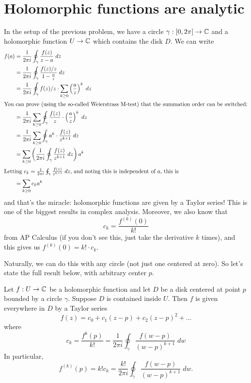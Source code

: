 \section{Holomorphic functions are analytic}
In the setup of the previous problem, we have a circle $\gamma : [0,2\pi] \to \mathbb C$
and a holomorphic function $U \to \mathbb C$ which contains the disk $D$.
We can write
\begin{align*}
	f(a) &= \frac{1}{2\pi i} \oint_\gamma \frac{f(z)}{z-a} \; dz \\
	&= \frac{1}{2\pi i} \oint_\gamma \frac{f(z)/z}{1 - \frac az} \; dz \\
	&= \frac{1}{2\pi i} \oint_\gamma f(z)/z \cdot \sum_{k \ge 0} \left( \frac az \right)^k \; dz \\
	\intertext{You can prove (using the so-called Weierstrass M-test) that the summation order can be switched:}
	&= \frac{1}{2\pi i} \sum_{k \ge 0} \oint_\gamma \frac{f(z)}{z} \cdot \left( \frac az \right)^k \; dz \\
	&= \frac{1}{2\pi i} \sum_{k \ge 0} \oint_\gamma a^k \cdot \frac{f(z)}{z^{k+1}} \; dz \\
	&=  \sum_{k \ge 0} \left( \frac{1}{2\pi i}\oint_\gamma \frac{f(z)}{z^{k+1}} \; dz \right) a^k \\
	\intertext{Letting $c_k =  \frac{1}{2\pi i}\oint_\gamma \frac{f(z)}{z^{k+1}} \; dz$, and noting
this is independent of $a$, this is}
	&=  \sum_{k \ge 0} c_k a^k
\end{align*}
and that's the miracle: holomorphic functions are given by a Taylor series!
This is one of the biggest results in complex analysis.
Moreover, we also know that \[ c_k = \frac{f^{(k)}(0)}{k!} \] from AP Calculus (if you don't see this,
just take the derivative $k$ times), and this gives us $f^{(k)}(0) = k! \cdot c_k$.

Naturally, we can do this with any circle (not just one centered at zero).
So let's state the full result below, with arbitrary center $p$.

\begin{theorem}
	Let $f : U \to \mathbb C$ be a holomorphic function and let $D$ be a disk centered at point $p$
	bounded by a circle $\gamma$.  Suppose $D$ is contained inside $U$.
	Then $f$ is given everywhere in $D$ by a Taylor series
	\[ 
		f(z) = c_0 + c_1(z-p) + c_2(z-p)^2 + \dots
	\]
	where
	\[
		c_k = \frac{f^{k}(p)}{k!} = \frac{1}{2\pi i} \oint_\gamma \frac{f(w-p)}{(w-p)^{k+1}} \; dw
	\]
	In particular, 
	\[ f^{(k)}(p) = k! c_k = \frac{k!}{2\pi i} \oint_\gamma \frac{f(w-p)}{(w-p)^{k+1}} \; dw. \]
\end{theorem}

